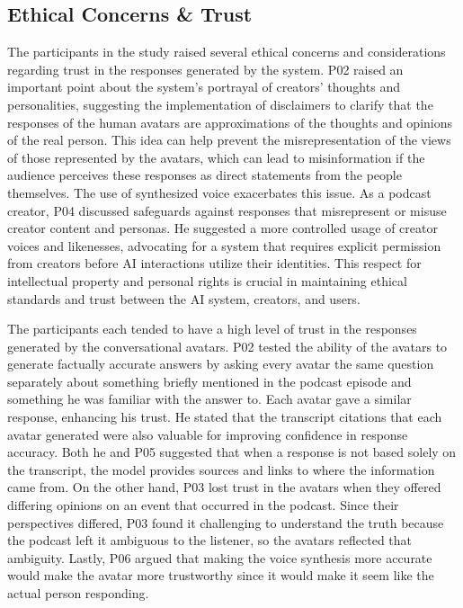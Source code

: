 \documentclass[12pt]{report}
\begin{document}
\begin{myfont}
        \subsection{Ethical Concerns \& Trust}
        The participants in the study raised several ethical concerns and considerations regarding trust in the responses generated by the system. P02 raised an important point about the system's portrayal of creators' thoughts and personalities, suggesting the implementation of disclaimers to clarify that the responses of the human avatars are approximations of the thoughts and opinions of the real person. This idea can help prevent the misrepresentation of the views of those represented by the avatars, which can lead to misinformation if the audience perceives these responses as direct statements from the people themselves. The use of synthesized voice exacerbates this issue. As a podcast creator, P04 discussed safeguards against responses that misrepresent or misuse creator content and personas. He suggested a more controlled usage of creator voices and likenesses, advocating for a system that requires explicit permission from creators before AI interactions utilize their identities. This respect for intellectual property and personal rights is crucial in maintaining ethical standards and trust between the AI system, creators, and users.

        \indent The participants each tended to have a high level of trust in the responses generated by the conversational avatars. P02 tested the ability of the avatars to generate factually accurate answers by asking every avatar the same question separately about something briefly mentioned in the podcast episode and something he was familiar with the answer to. Each avatar gave a similar response, enhancing his trust. He stated that the transcript citations that each avatar generated were also valuable for improving confidence in response accuracy. Both he and P05 suggested that when a response is not based solely on the transcript, the model provides sources and links to where the information came from. On the other hand, P03 lost trust in the avatars when they offered differing opinions on an event that occurred in the podcast. Since their perspectives differed, P03 found it challenging to understand the truth because the podcast left it ambiguous to the listener, so the avatars reflected that ambiguity. Lastly, P06 argued that making the voice synthesis more accurate would make the avatar more trustworthy since it would make it seem like the actual person responding.


\end{myfont}
\end{document}

